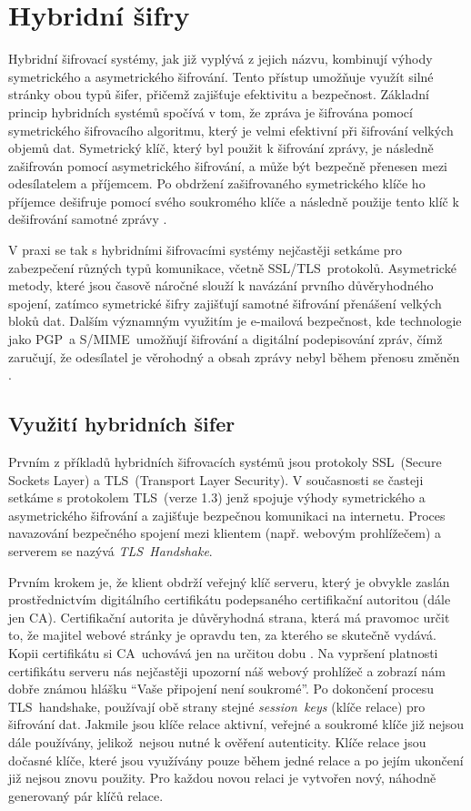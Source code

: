 \section{Hybridní šifry}
\label{sec:hybridni-sifra}

Hybridní šifrovací systémy, jak již vyplývá z jejich názvu, kombinují výhody symetrického a asymetrického šifrování. Tento přístup umožňuje využít silné stránky obou typů šifer, přičemž zajišťuje efektivitu a bezpečnost.
Základní princip hybridních systémů spočívá v tom, že zpráva je šifrována pomocí symetrického šifrovacího algoritmu, který je velmi efektivní při šifrování velkých objemů dat. Symetrický klíč, který byl použit k šifrování zprávy, je následně zašifrován pomocí asymetrického šifrování, a může být bezpečně přenesen mezi odesílatelem a příjemcem. Po obdržení zašifrovaného symetrického klíče ho příjemce dešifruje pomocí svého soukromého klíče a následně použije tento klíč k dešifrování samotné zprávy \parencite{pavlicek2012}.

V praxi se tak s hybridními šifrovacími systémy nejčastěji setkáme pro zabezpečení různých typů komunikace, včetně SSL/TLS~protokolů. Asymetrické metody, které jsou časově náročné slouží k navázání prvního důvěryhodného spojení, zatímco symetrické šifry zajišťují samotné šifrování přenášení velkých bloků dat. Dalším významným využitím je e-mailová bezpečnost, kde technologie jako PGP~a S/MIME~umožňují šifrování a digitální podepisování zpráv, čímž zaručují, že odesílatel je věrohodný a obsah zprávy nebyl během přenosu změněn \mbox{\parencite{sedlak2021}.}

\subsection{Využití hybridních šifer}

Prvním z příkladů hybridních šifrovacích systémů jsou protokoly SSL~(Secure Sockets Layer) a TLS~(Transport Layer Security). V současnosti se časteji setkáme s protokolem TLS~(verze 1.3) jenž spojuje výhody symetrického a asymetrického šifrování a zajišťuje bezpečnou komunikaci na internetu. Proces navazování bezpečného spojení mezi klientem (např. webovým prohlížečem) a serverem se nazývá \emph{TLS~Handshake}. 

Prvním krokem je, že klient obdrží veřejný klíč serveru, který je obvykle zaslán prostřednictvím digitálního certifikátu podepsaného certifikační autoritou (dále jen CA). Certifikační autorita je důvěryhodná strana, která má pravomoc určit to, že majitel webové stránky je opravdu ten, za kterého se skutečně vydává. Kopii certifikátu si CA~uchovává jen na určitou dobu \parencite{cloudflare2024}. Na vypršení platnosti certifikátu serveru nás nejčastěji upozorní náš webový prohlížeč a zobrazí nám dobře známou hlášku \enquote{Vaše připojení není soukromé}. 
Po dokončení procesu TLS~handshake, používají obě strany stejné \emph{session~keys} (klíče relace) pro šifrování dat. Jakmile jsou klíče relace aktivní, veřejné a soukromé klíče již nejsou dále používány, jelikož~nejsou nutné k ověření autenticity. Klíče relace jsou dočasné klíče, které jsou využívány pouze během jedné relace a po jejím ukončení již nejsou znovu použity. Pro každou novou relaci je vytvořen nový, náhodně generovaný pár klíčů relace.

